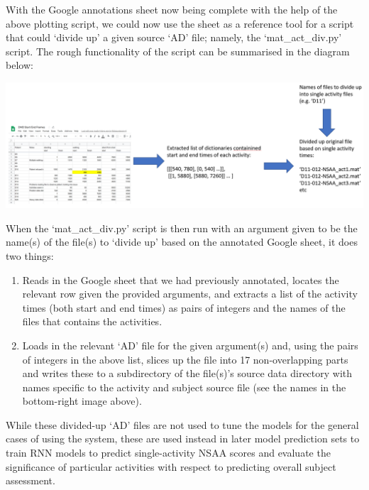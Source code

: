 \documentclass[12pt,twoside]{report}
\begin{document}
\quad With the Google annotations sheet now being complete with the help of the above plotting script, we could now use the sheet as a reference tool for a script that could ‘divide up’ a given source ‘AD’ file; namely, the ‘mat\_act\_div.py’ script. The rough functionality of the script can be summarised in the diagram below:

\begin{center}
\includegraphics[scale=0.23]{project_figures/fig8_11}
\end{center}

\quad When the ‘mat\_act\_div.py’ script is then run with an argument given to be the name(s) of the file(s) to ‘divide up’ based on the annotated Google sheet, it does two things:

\begin{enumerate}
	\item Reads in the Google sheet that we had previously annotated, locates the relevant row given the provided arguments, and extracts a list of the activity times (both start and end times) as pairs of integers and the names of the files that contains the activities.
	\item Loads in the relevant ‘AD’ file for the given argument(s) and, using the pairs of integers in the above list, slices up the file into 17 non-overlapping parts and writes these to a subdirectory of the file(s)’s source data directory with names specific to the activity and subject source file (see the names in the bottom-right image above).
\end{enumerate}

\quad While these divided-up ‘AD’ files are not used to tune the models for the general cases of using the system, these are used instead in later model prediction sets to train RNN models to predict single-activity NSAA scores and evaluate the significance of particular activities with respect to predicting overall subject assessment.
\end{document}
